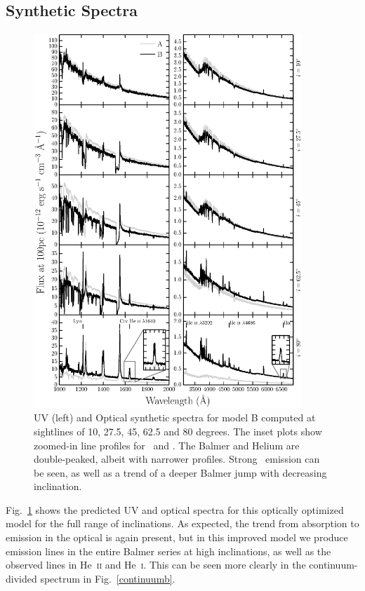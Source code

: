 \documentclass[preprint, a4paper, 11pt]{aastex}
\begin{document}
\subsection{Synthetic Spectra}

\begin{figure} %
\includegraphics[width=0.9\textwidth]{figures/modelb_uv_opt.eps}
\caption{
UV (left) and Optical synthetic spectra for model B computed at
sightlines of 10, 27.5, 45, 62.5 and 80 degrees.	
The inset plots show zoomed-in line profiles for 
\heiiuv\ and \ha. The Balmer and Helium
are double-peaked, albeit with narrower profiles.
Strong \heiiopt\ emission can be seen, as well as a trend
of a deeper Balmer jump with decreasing inclination.
}
\label{uvoptb}
\end{figure} %

Fig.~\ref{uvoptb} shows the predicted UV and optical spectra for this
optically optimized model for the full range of inclinations. 
As expected, the trend from absorption to emission 
in the optical is again present, but in this improved model we produce emission
lines in the entire Balmer series at high inclinations, as well as the observed lines 
in He~\textsc{ii} and He~\textsc{i}. This can be seen more clearly in the 
continuum-divided spectrum in Fig.~\ref{continuumb}.
\end{document}
